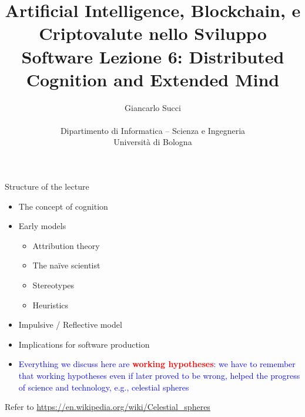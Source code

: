 \documentclass{beamer}
\title[L04]{Artificial Intelligence, Blockchain, e Criptovalute nello Sviluppo Software \newline\newline
Lezione 6: Distributed Cognition and Extended Mind} %
\author[{\tiny Giancarlo Succi }]{Giancarlo Succi\\\\ Dipartimento di Informatica -- Scienza e Ingegneria\\Universit\`{a} di Bologna\\
\bftt{g.succi@unibo.it}
} %
\institute[unibo] %
\date{} %
\begin{document}
\begin{frame}
\titlepage %

\end{frame}





\begin{frame}
{\centerline{Structure of the lecture}}
\begin{itemize}
    \item The concept of cognition
    \item Early models
    \begin{itemize}
        \item Attribution theory
        \item The na\"{i}ve scientist
        \item Stereotypes
        \item Heuristics
    \end{itemize} 
    \item Impulsive / Reflective model
    \item Implications for software production
    \item \textcolor{blue}{Everything we discuss here are \textcolor{red}{\bf working hypotheses}: we have to remember that working hypotheses even if later proved to be wrong, helped the progress of science and technology, e.g., celestial spheres}
\end{itemize} 
\begin{center}
    \tiny{Refer to \url{https://en.wikipedia.org/wiki/Celestial_spheres}}
\end{center}

\end{frame}
\end{document}
